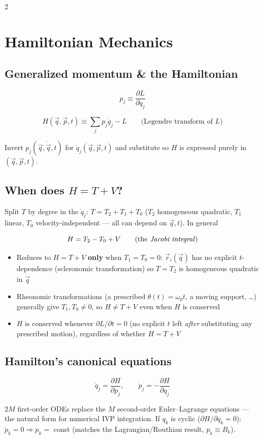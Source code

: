 \documentclass[10pt]{article}
\begin{document}
\begin{multicols}{2}
\section*{Hamiltonian Mechanics}
\subsection*{Generalized momentum \& the Hamiltonian}
\[
    p_j \equiv \frac{\partial L}{\partial\dot q_j}
\]
\begin{keybox}
\[
    H(\vec q,\vec p,t) \equiv \sum_j p_j\dot q_j - L \qquad\text{(Legendre transform of }L\text{)}
\]
\end{keybox}
Invert $p_j(\vec q,\dot{\vec q},t)$ for $\dot q_j(\vec q,\vec p,t)$ and substitute so $H$ is expressed purely in $(\vec q,\vec p,t)$.

\subsection*{When does $H=T+V$?}
Split $T$ by degree in the $\dot q_j$: $T=T_2+T_1+T_0$ ($T_2$ homogeneous quadratic, $T_1$ linear, $T_0$ velocity-independent --- all can depend on $\vec q,t$). In general
\begin{keybox}
\[
    H = T_2-T_0+V \qquad\text{(the \emph{Jacobi integral})}
\]
\end{keybox}
\begin{itemize}[nosep, leftmargin=1.1em]
    \item Reduces to $H=T+V$ \textbf{only} when $T_1=T_0=0$: $\vec r_i(\vec q)$ has no explicit $t$-dependence (scleronomic transformation) so $T=T_2$ is homogeneous quadratic in $\dot{\vec q}$
    \item Rheonomic transformations (a prescribed $\theta(t)=\omega_0t$, a moving support, \dots) generally give $T_1,T_0\neq0$, so $H\neq T+V$ even when $H$ is conserved
    \item $H$ is conserved whenever $\partial L/\partial t=0$ (no explicit $t$ left \emph{after} substituting any prescribed motion), regardless of whether $H=T+V$
\end{itemize}

\subsection*{Hamilton's canonical equations}
\begin{keybox}
\[
    \dot q_j = \frac{\partial H}{\partial p_j}, \qquad \dot p_j = -\frac{\partial H}{\partial q_j}
\]
\end{keybox}
$2M$ first-order ODEs replace the $M$ second-order Euler--Lagrange equations --- the natural form for numerical IVP integration. If $q_k$ is cyclic ($\partial H/\partial q_k=0$): $\dot p_k=0\Rightarrow p_k=$ const (matches the Lagrangian/Routhian result, $p_k\equiv B_k$).


\end{multicols}
\end{document}
